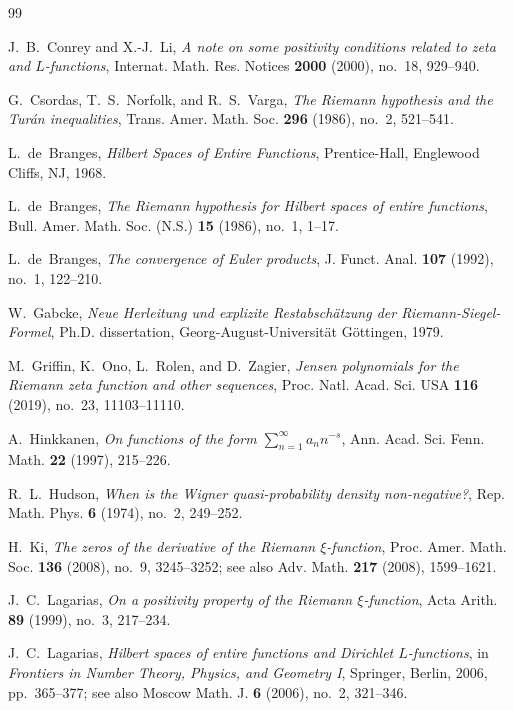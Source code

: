 \documentclass[11pt,reqno]{amsart}
\theoremstyle{definition}
\theoremstyle{remark}
\numberwithin{equation}{section}
\begin{document}
\begin{thebibliography}{99}

J.~B.~Conrey and X.-J.~Li,
\emph{A note on some positivity conditions related to zeta and $L$-functions},
Internat. Math. Res. Notices \textbf{2000} (2000), no.~18, 929--940.

G.~Csordas, T.~S.~Norfolk, and R.~S.~Varga,
\emph{The Riemann hypothesis and the Tur\'an inequalities},
Trans. Amer. Math. Soc. \textbf{296} (1986), no.~2, 521--541.

L.~de~Branges,
\emph{Hilbert Spaces of Entire Functions},
Prentice-Hall, Englewood Cliffs, NJ, 1968.

L.~de~Branges,
\emph{The Riemann hypothesis for Hilbert spaces of entire functions},
Bull. Amer. Math. Soc. (N.S.) \textbf{15} (1986), no.~1, 1--17.

L.~de~Branges,
\emph{The convergence of Euler products},
J. Funct. Anal. \textbf{107} (1992), no.~1, 122--210.

W.~Gabcke,
\emph{Neue Herleitung und explizite Restabsch\"atzung der Riemann-Siegel-Formel},
Ph.D. dissertation, Georg-August-Universit\"at G\"ottingen, 1979.

M.~Griffin, K.~Ono, L.~Rolen, and D.~Zagier,
\emph{Jensen polynomials for the Riemann zeta function and other sequences},
Proc. Natl. Acad. Sci. USA \textbf{116} (2019), no.~23, 11103--11110.

A.~Hinkkanen,
\emph{On functions of the form $\sum_{n=1}^{\infty} a_n n^{-s}$},
Ann. Acad. Sci. Fenn. Math. \textbf{22} (1997), 215--226.

R.~L.~Hudson,
\emph{When is the Wigner quasi-probability density non-negative?},
Rep. Math. Phys. \textbf{6} (1974), no.~2, 249--252.

H.~Ki,
\emph{The zeros of the derivative of the Riemann $\xi$-function},
Proc. Amer. Math. Soc. \textbf{136} (2008), no.~9, 3245--3252; see also Adv. Math. \textbf{217} (2008), 1599--1621.

J.~C.~Lagarias,
\emph{On a positivity property of the Riemann $\xi$-function},
Acta Arith. \textbf{89} (1999), no.~3, 217--234.

J.~C.~Lagarias,
\emph{Hilbert spaces of entire functions and Dirichlet $L$-functions},
in \emph{Frontiers in Number Theory, Physics, and Geometry I}, Springer, Berlin, 2006, pp.~365--377; see also Moscow Math. J. \textbf{6} (2006), no.~2, 321--346.


\end{thebibliography}
\end{document}
